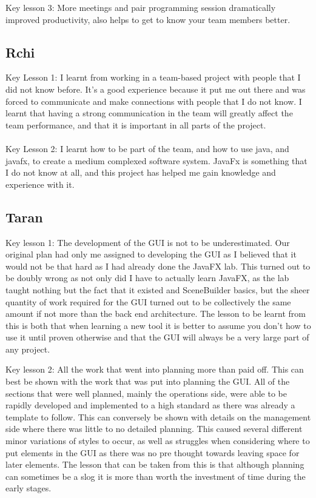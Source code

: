 Key lesson 3:
More meetings and pair programming session dramatically improved productivity, also helps to get to know your team members better.

\subsection{Rchi}
Key Lesson 1:
I learnt from working in a team-based project with people that I did not know before. It's a good experience because it put me out there and was forced to communicate and make connections with people that I do not know. I learnt that having a strong communication in the team will greatly affect the team performance, and that it is important in all parts of the project. \\ \\ Key Lesson 2:
I learnt how to be part of the team, and how to use java, and javafx, to create a medium complexed software system. JavaFx is something that I do not know at all, and this project has helped me gain knowledge and experience with it.

\subsection{Taran}
Key lesson 1:
The development of the GUI is not to be underestimated. Our original plan had only me assigned to developing the GUI as I believed that it would not be that hard as I had already done the JavaFX lab. This turned out to be doubly wrong as not only did I have to actually learn JavaFX, as the lab taught nothing but the fact that it existed and SceneBuilder basics, but the sheer quantity of work required for the GUI turned out to be collectively the same amount if not more than the back end architecture.
The lesson to be learnt from this is both that when learning a new tool it is better to assume you don't how to use it until proven otherwise and that the GUI will always be a very large part of any project.

Key lesson 2:
All the work that went into planning more than paid off. This can best be shown with the work that was put into planning the GUI. All of the sections that were well planned, mainly the operations side, were able to be rapidly developed and implemented to a high standard as there was already a template to follow. This can conversely be shown with details on the management side where there was little to no detailed planning. This caused several different minor variations of styles to occur, as well as struggles when considering where to put elements in the GUI as there was no pre thought towards leaving space for later elements.
The lesson that can be taken from this is that although planning can sometimes be a slog it is  more than worth the investment of time during the early stages.
